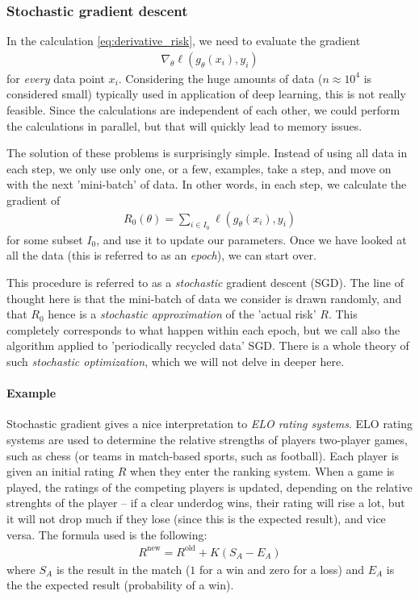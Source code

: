 \documentclass{article}
\begin{document}
\subsubsection{Stochastic gradient descent}
In the calculation \eqref{eq:derivative_risk}, we need to evaluate the gradient
\begin{align*}
    \nabla_\theta \ell(g_\theta(x_i),y_i)
\end{align*}
for \emph{every} data point $x_i$. Considering the huge amounts of data  ($n\approx 10^4$ is considered small) typically used in application of deep learning, this is not really feasible. Since the calculations are independent of each other, we could perform the calculations in parallel, but that will quickly lead to memory issues.

The solution of these problems is surprisingly simple. Instead of using all data in each step, we only use only one, or a few, examples, take a step, and move on with the next 'mini-batch' of data. In other words, in each step, we calculate the gradient of 
\begin{align*}
    R_0(\theta)= \sum_{i \in I_0} \ell(g_\theta(x_i),y_i)
\end{align*}
for some subset $I_0$, and use it to update our parameters. Once we have looked at all the data (this is referred to as an \emph{epoch}), we can start over. 

This procedure is referred to as a \emph{stochastic} gradient descent (SGD). The line of thought here is that the mini-batch of data we consider is drawn randomly, and that $R_0$ hence is a \emph{stochastic approximation} of the 'actual risk' $R$. This completely corresponds to what happen within each epoch, but we call also the algorithm applied to 'periodically recycled data' SGD. There is a whole theory of such \emph{stochastic optimization}, which we will not delve in deeper here.

\paragraph{Example} Stochastic gradient gives a nice interpretation to \emph{ELO rating systems}. ELO rating systems are used to determine the relative strengths of players two-player games, such as chess (or teams in match-based sports, such as football). Each player is given an initial rating $R$ when they enter the ranking system. When a game is played, the ratings of the competing players is updated, depending on the relative strenghts of the player -- if a clear underdog wins, their rating will rise a lot, but it will not drop much if they lose (since this is the expected result), and vice versa. The formula used is the following:
\begin{align}
    R^{\mathrm{new}} = R^{\mathrm{old}} + K(S_A-E_A) \label{eq:ELO_update}
\end{align}
where $S_A$ is the result in the match ($1$ for a win and zero for a loss) and $E_A$ is the the expected result (probability of a win). 
\end{document}
